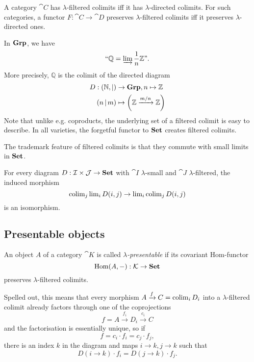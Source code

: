 \begin{Proposition}A category $\cat C$ has $\lambda$-filtered colimits iff it has $\lambda$-directed colimits. For such categories, a functor $F : \cat C \to \cat D$ preserves $\lambda$-filtered colimits iff it preserves $\lambda$-directed ones.
\end{Proposition}

\begin{Example}\label{ex:Q}
In $\mathbf{Grp}$, we have 
\[ \text{``}\mathbb Q = \varinjlim \frac 1 n \mathbb Z\text{''}. \]
More precisely, $\mathbb Q$ is the colimit of the directed diagram
\begin{align*}
 D : (\mathbb N, |) &\to \mathbf{Grp}, n \mapsto \mathbb Z \\
 (n\, | \,m) &\mapsto \left(\mathbb Z \xrightarrow{m/n} \mathbb Z\right)
\end{align*}
Note that unlike e.g. coproducts, the underlying set of a filtered colimit is easy to describe. In all varieties, the forgetful functor to $\mathbf{Set}$ creates filtered colimits.
\end{Example}

The trademark feature of filtered colimits is that they commute with small limits in $\mathbf{Set}$.

\begin{Lemma}\label{prop:smallvsfiltered}
For every diagram $D : \mathcal{I} \times \mathcal{J} \to \mathbf{Set}$ with $\cat I$ $\lambda$-small and $\cat J$ $\lambda$-filtered, the induced morphism
\[ \operatorname{colim}_j \operatorname{lim}_i D(i,j) \to \operatorname{lim}_i \operatorname{colim}_j D(i,j) \]
is an isomorphism.
\end{Lemma}

\subsection{Presentable objects}
\begin{Definition}\label{def:presentableobject}
An object $A$ of a category $\cat K$ is called \emph{$\lambda$-presentable} if its covariant Hom-functor 
\[ \textrm{Hom}(A,-) : \mathcal{K} \to \mathbf{Set} \]
preserves $\lambda$-filtered colimits.
\end{Definition}
Spelled out, this means that every morphism $A \xrightarrow{f} C = \operatorname{colim}_i D_i$ into a $\lambda$-filtered colimit already factors through one of the coprojections
\[ f = A \xrightarrow{f_i} D_i \xrightarrow{c_i} C \]
and the factorisation is essentially unique, so if \[ f = c_i\cdot f_i = c_j \cdot f_j, \]
there is an index $k$ in the diagram and maps $i \to k, j \to k$ such that
\[ D(i \to k)\cdot f_i = D(j \to k) \cdot f_j. \]

